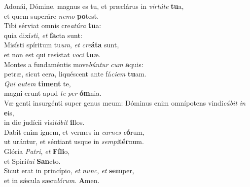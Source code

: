 \evenverse Adonái, Dómine, magnus es tu, et præclárus in \textit{vir}\textit{tú}\textit{te} \textbf{tu}a,~\*\\
\evenverse et quem superáre \textit{ne}\textit{mo} \textbf{po}test.\\
\oddverse Tibi sérviat omnis cre\textit{a}\textit{tú}\textit{ra} \textbf{tu}a:~\*\\
\oddverse quia dixí\textit{sti}, \textit{et} \textbf{fa}cta sunt:\\
\evenverse Misísti spíritum tu\textit{um}, \textit{et} \textit{cre}\textbf{á}\textbf{ta} sunt,~\*\\
\evenverse et non est qui resístat \textit{vo}\textit{ci} \textbf{tu}æ.\\
\oddverse Montes a fundaméntis move\textit{bún}\textit{tur} \textit{cum} \textbf{a}quis:~\*\\
\oddverse petræ, sicut cera, liquéscent ante fá\textit{ci}\textit{em} \textbf{tu}am.\\
\evenverse \textit{Qui} \textit{au}\textit{tem} \textbf{ti}\textbf{ment} te,~\*\\
\evenverse magni erunt apud \textit{te} \textit{per} \textbf{óm}nia.\\
\oddverse Væ genti insurgénti super genus meum: Dóminus enim omnípotens vindi\textit{cá}\textit{bit} \textit{in} \textbf{e}is,~\*\\
\oddverse in die judícii visi\textit{tá}\textit{bit} \textbf{il}los.\\
\evenverse Dabit enim ignem, et vermes in \textit{car}\textit{nes} \textit{e}\textbf{ó}rum,~\*\\
\evenverse ut urántur, et séntiant usque in \textit{sem}\textit{pi}\textbf{tér}num.\\
\oddverse Glória \textit{Pa}\textit{tri}, \textit{et} \textbf{Fí}\textbf{li}o,~\*\\
\oddverse et Spirí\textit{tu}\textit{i} \textbf{San}cto.\\
\evenverse Sicut erat in princípio, \textit{et} \textit{nunc}, \textit{et} \textbf{sem}per,~\*\\
\evenverse et in sǽcula sæcu\textit{ló}\textit{rum}. \textbf{A}men.\\
